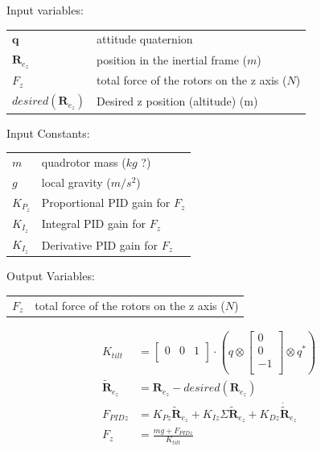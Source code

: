 \documentclass{article}
\numberwithin{equation}{section} %
\newcommand{\bs}[1]{\boldsymbol{#1}}
\begin{document}
\bigskip
Input variables:
\begin{tabular}{l l}
 	$ \mathbf{q} $ 			& attitude quaternion \\
 	$ \boldsymbol{R}_{e_z} $	& position in the inertial frame ($m$) \\
 	$ F_{z} $				& total force of the rotors on the z axis ($N$) \\
 	$desired \left( \bs{R}_{e_z} \right)$ & Desired z position (altitude) (m) \\
\end{tabular}

\bigskip
Input Constants:
\begin{tabular}{l l}

 	$m$						& quadrotor mass ($kg$ ?) \\
 	$g$						& local gravity ($m/s^2$) \\
 	$K_{P_z}$				& Proportional PID gain for $F_z$ \\
	$K_{I_z}$				& Integral PID gain for $F_z$ \\
	$K_{I_z}$				& Derivative PID gain for $F_z$ \\
\end{tabular}

\bigskip
Output Variables:
\begin{tabular}{l l}
 	$ F_{z} $				& total force of the rotors on the z axis ($N$) \\
\end{tabular}




\begin{align}
K_{tilt} &= 
	\begin{bmatrix}
		0 & 0 & 1 \\	
	\end{bmatrix}
	\cdot
	\left(
		q \otimes
			\begin{bmatrix}
				0 \\
				0 \\
				-1 \\
			\end{bmatrix}
		\otimes q^*
	\right) \\
\tilde{\bs{R}}_{e_z} &= \bs{R}_{e_z} - desired \left( \bs{R}_{e_z} \right) \\
	F_{PIDz} &= K_{Pz} \tilde{\bs{R}}_{e_z} + K_{Iz} \Sigma \tilde{\bs{R}}_{e_z} + K_{Dz} \dot{\tilde{\bs{R}}}_{e_z} \\ %
	F_z &= \frac{mg + F_{PIDz}} {K_{tilt}}
\end{align}
\end{document}
